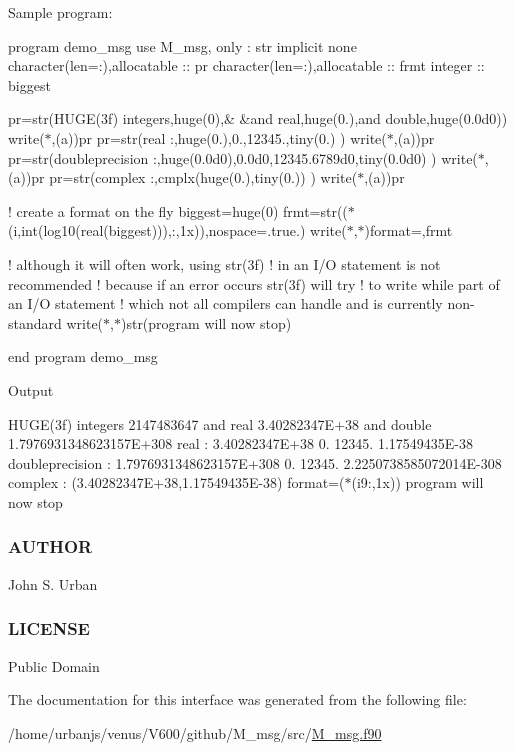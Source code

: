 Sample program\+:

program demo\+\_\+msg use M\+\_\+msg, only \+: str implicit none character(len=\+:),allocatable \+:\+: pr character(len=\+:),allocatable \+:\+: frmt integer \+:\+: biggest

pr=str(\textquotesingle{}H\+U\+G\+E(3f) integers\textquotesingle{},huge(0),\& \&\textquotesingle{}and real\textquotesingle{},huge(0.),\textquotesingle{}and double\textquotesingle{},huge(0.\+0d0)) write($\ast$,\textquotesingle{}(a)\textquotesingle{})pr pr=str(\textquotesingle{}real \+:\textquotesingle{},huge(0.),0.,12345.,tiny(0.) ) write($\ast$,\textquotesingle{}(a)\textquotesingle{})pr pr=str(\textquotesingle{}doubleprecision \+:\textquotesingle{},huge(0.\+0d0),0.\+0d0,12345.\+6789d0,tiny(0.\+0d0) ) write($\ast$,\textquotesingle{}(a)\textquotesingle{})pr pr=str(\textquotesingle{}complex \+:\textquotesingle{},cmplx(huge(0.),tiny(0.)) ) write($\ast$,\textquotesingle{}(a)\textquotesingle{})pr

! create a format on the fly biggest=huge(0) frmt=str(\textquotesingle{}($\ast$(i\textquotesingle{},int(log10(real(biggest))),\textquotesingle{}\+:,1x))\textquotesingle{},nospace=.true.) write($\ast$,$\ast$)\textquotesingle{}format=\textquotesingle{},frmt

! although it will often work, using str(3f) ! in an I/O statement is not recommended ! because if an error occurs str(3f) will try ! to write while part of an I/O statement ! which not all compilers can handle and is currently non-\/standard write($\ast$,$\ast$)str(\textquotesingle{}program will now stop\textquotesingle{})

end program demo\+\_\+msg

Output

H\+U\+G\+E(3f) integers 2147483647 and real 3.\+40282347E+38 and double 1.\+7976931348623157E+308 real \+: 3.\+40282347E+38 0. 12345. 1.\+17549435E-\/38 doubleprecision \+: 1.\+7976931348623157E+308 0. 12345. 2.\+2250738585072014E-\/308 complex \+: (3.\+40282347E+38,1.\+17549435E-\/38) format=($\ast$(i9\+:,1x)) program will now stop

\subsubsection*{A\+U\+T\+H\+OR}

John S. Urban

\subsubsection*{L\+I\+C\+E\+N\+SE}

Public Domain 

The documentation for this interface was generated from the following file\+:\begin{DoxyCompactItemize}
\item 
/home/urbanjs/venus/\+V600/github/\+M\+\_\+msg/src/\mbox{\hyperlink{M__msg_8f90}{M\+\_\+msg.\+f90}}\end{DoxyCompactItemize}
